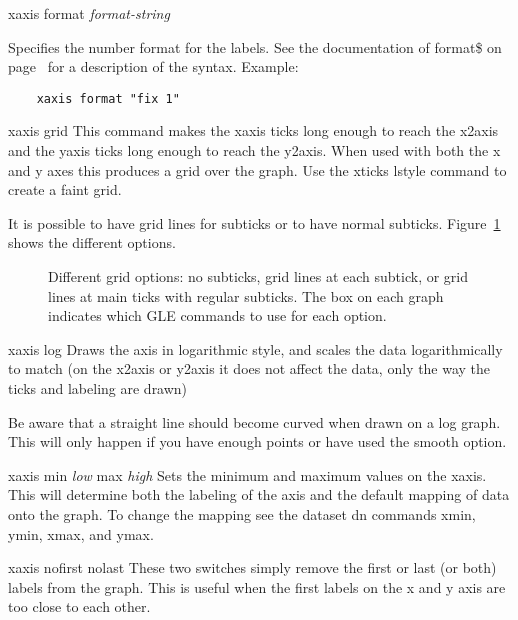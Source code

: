 \begin{commanddescription}
\item[{\sf xaxis format {\it format-string}} ]

Specifies the number format for the labels. See the documentation of {\sf format\$} on page~\pageref{formatnum:pg} for a description of the syntax. Example:

\preglecode{}
\begin{Verbatim}
	xaxis format "fix 1"
\end{Verbatim}
\postglecode{}

\item[{\sf xaxis grid }  ]
This command makes the xaxis ticks long enough to reach the x2axis and the yaxis ticks long enough to reach the y2axis. When used with both the x and y axes this produces a grid over the graph. Use the {\sf xticks lstyle} command to create a faint grid.

It is possible to have grid lines for subticks or to have normal subticks. Figure~\ref{gridmode:fig} shows the different options.

\begin{figure}[tb]
\centering

\caption{\label{gridmode:fig}Different grid options: no subticks, grid lines at each subtick, or grid lines at main ticks with regular subticks. The box on each graph indicates which GLE commands to use for each option.}
\end{figure}

\item[{\sf xaxis log}  ]
Draws the axis in logarithmic style, and scales the data logarithmically
to match (on the x2axis or y2axis it does not affect the data, only the
way the ticks and labeling are drawn)

Be aware that a straight line should become curved
when drawn on a log graph.  This will only happen if you have
enough points or have used the {\sf smooth} option.

\item[{\sf xaxis min {\it low} max {\it high}} ]
Sets the minimum and maximum values on the xaxis.  This will determine both the
labeling of the axis and the default mapping of data onto the graph.
To change the mapping see the dataset {\sf dn} commands
{\sf xmin}, {\sf ymin}, {\sf xmax}, and {\sf ymax}.

\item[{\sf xaxis nofirst nolast}  ]
These two switches simply remove the first or last (or both) labels from
the graph.  This is useful when the first labels on
the x and y axis are too close to each other.


\end{commanddescription}
